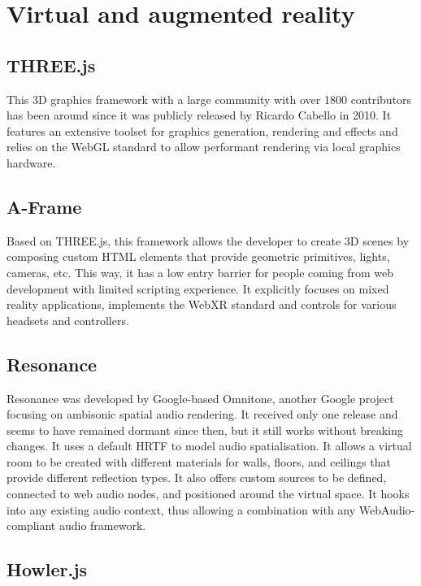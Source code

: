 \section{Virtual and augmented reality}

\subsection{THREE.js}

This \ac{3D} graphics framework with a large community with over 1800 contributors has been around since it was publicly released by Ricardo Cabello in 2010. It features an extensive toolset for graphics generation, rendering and effects and relies on the WebGL standard to allow performant rendering via local graphics hardware.

\subsection{A-Frame}

Based on THREE.js, this framework allows the developer to create \ac{3D} scenes by composing custom HTML elements that provide geometric primitives, lights, cameras, etc. This way, it has a low entry barrier for people coming from web development with limited scripting experience. It explicitly focuses on mixed reality applications, implements the WebXR standard and controls for various headsets and controllers.

\subsection{Resonance}

Resonance was developed by Google-based Omnitone, another Google project focusing on ambisonic spatial audio rendering. It received only one release and seems to have remained dormant since then, but it still works without breaking changes. It uses a default \ac{HRTF} to model audio spatialisation. It allows a virtual room to be created with different materials for walls, floors, and ceilings that provide different reflection types. It also offers custom sources to be defined, connected to web audio nodes, and positioned around the virtual space. It hooks into any existing audio context, thus allowing a combination with any WebAudio-compliant audio framework.

\subsection{Howler.js}

